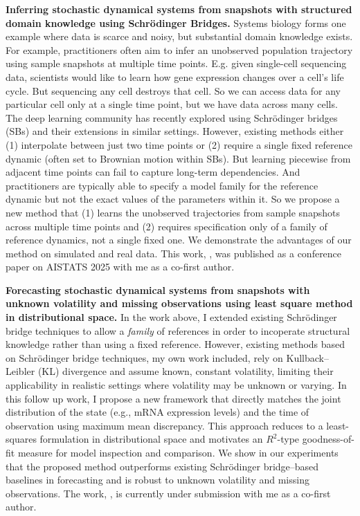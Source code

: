 

\textbf{Inferring stochastic dynamical systems from snapshots with structured domain knowledge using Schrödinger Bridges.} Systems biology forms one example where data is scarce and noisy, but substantial domain knowledge exists. For example, practitioners often aim to infer an unobserved population trajectory using sample snapshots at multiple time points. E.g. given single-cell sequencing data, scientists would like to learn how gene expression changes over a cell’s life cycle. But sequencing any cell destroys that cell. 
So we can access data for any particular cell only at a single time point, but we have data across many cells. The deep learning community has recently explored using Schrödinger bridges (SBs) and their extensions in similar settings. However, existing methods either (1) interpolate between just two time points or (2) require a single fixed reference dynamic (often set to Brownian motion within SBs). But learning piecewise from adjacent time points can fail to capture long-term dependencies. And practitioners are typically able to specify a model family for the reference dynamic but not the exact values of the parameters within it. So we propose a new method that (1) learns the unobserved trajectories from sample snapshots across multiple time points and (2) requires specification only of a family of reference dynamics, not a single fixed one. We demonstrate the advantages of our method on simulated and real data. This work, \cite{shen2025multi}, was published as a conference paper on AISTATS 2025 with me as a co-first author. 


\textbf{Forecasting stochastic dynamical systems from snapshots with unknown volatility and missing observations using least square method in distributional space.} %
In the work above, I extended  existing Schrödinger bridge techniques to allow a \textit{family} of references in order to incoperate structural knowledge rather than using a fixed reference. However, existing methods based on Schrödinger bridge techniques, my own work included, rely on Kullback–Leibler (KL) divergence and assume known, constant volatility, limiting their applicability in realistic settings where volatility may be unknown or varying. In this follow up work, I propose a new framework that directly matches the joint distribution of the state (e.g., mRNA expression levels) and the time of observation using maximum mean discrepancy. This approach reduces to a least-squares formulation in distributional space and motivates an $R^2$-type goodness-of-fit measure for model inspection and comparison. We show in our experiments that the proposed method outperforms existing Schrödinger bridge–based baselines in forecasting and is robust to unknown volatility and missing observations. The work, \cite{berlinghieri2025oh}, is currently under submission with me as a co-first author.


